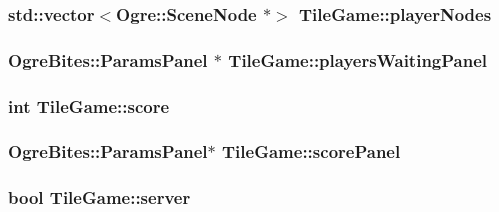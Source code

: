\hypertarget{classTileGame_ab261f06fa3d89f8af2223ffe1a56337a}{
\subsubsection[{player\-Nodes}]{\setlength{\rightskip}{0pt plus 5cm}std\-::vector$<$Ogre\-::\-Scene\-Node $\ast$$>$ Tile\-Game\-::player\-Nodes\hspace{0.3cm}{\ttfamily [protected]}}}\label{classTileGame_ab261f06fa3d89f8af2223ffe1a56337a}
\hypertarget{classTileGame_a6ec622cd0062396ffa3e929702fc870d}{
\subsubsection[{players\-Waiting\-Panel}]{\setlength{\rightskip}{0pt plus 5cm}Ogre\-Bites\-::\-Params\-Panel $\ast$ Tile\-Game\-::players\-Waiting\-Panel\hspace{0.3cm}{\ttfamily [protected]}}}\label{classTileGame_a6ec622cd0062396ffa3e929702fc870d}
\hypertarget{classTileGame_abba0100f7c52d2a9ae1bfa0f5bbee4a5}{
\subsubsection[{score}]{\setlength{\rightskip}{0pt plus 5cm}int Tile\-Game\-::score\hspace{0.3cm}{\ttfamily [protected]}}}\label{classTileGame_abba0100f7c52d2a9ae1bfa0f5bbee4a5}
\hypertarget{classTileGame_a9a4d1b4dfacca55fdeacf454af04fa0c}{
\subsubsection[{score\-Panel}]{\setlength{\rightskip}{0pt plus 5cm}Ogre\-Bites\-::\-Params\-Panel$\ast$ Tile\-Game\-::score\-Panel\hspace{0.3cm}{\ttfamily [protected]}}}\label{classTileGame_a9a4d1b4dfacca55fdeacf454af04fa0c}
\hypertarget{classTileGame_a8f1f5171595cb9819f47ad2c9849e810}{
\subsubsection[{server}]{\setlength{\rightskip}{0pt plus 5cm}bool Tile\-Game\-::server\hspace{0.3cm}{\ttfamily [protected]}}}\label{classTileGame_a8f1f5171595cb9819f47ad2c9849e810}
